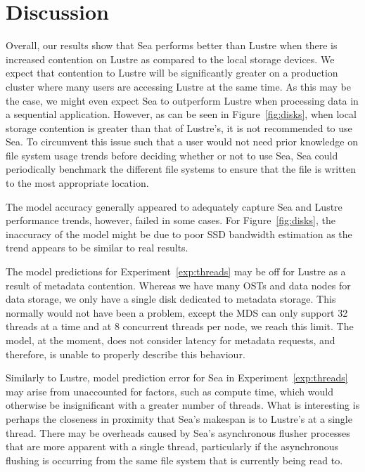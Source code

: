 \documentclass{report}
\begin{document}
    \section{Discussion}\label{discussion}

    Overall, our results show that Sea performs better than Lustre when there is
    increased contention on Lustre as compared to the local storage devices. We
    expect that contention to Lustre will be significantly greater on a 
    production cluster where many users are accessing Lustre at the same time.
    As this may be the case, we might even expect Sea to outperform Lustre when
    processing data in a sequential application. However, as can be seen in
    Figure~\ref{fig:disks}, when local storage contention is greater than that
    of Lustre's, it is not recommended to use Sea. To circumvent this issue
    such that a user would not need prior knowledge on file system usage trends
    before deciding whether or not to use Sea, Sea could periodically benchmark
    the different file systems to ensure that the file is written to the most
    appropriate location.

    The model accuracy generally appeared to adequately capture Sea and Lustre
    performance trends, however, failed in some cases.
    For Figure~\ref{fig:disks}, the inaccuracy of the model might be due to poor
    SSD bandwidth estimation as the trend appears to be similar to real results.
    
    The model predictions for Experiment~\ref{exp:threads} may be off for Lustre as a result
    of metadata contention. Whereas we have many OSTs and data nodes for
    data storage, we only have a single disk dedicated to metadata storage.
    This normally would not have been a problem, except the MDS can only support
    32 threads at a time and at 8 concurrent threads per node, we reach this limit.
    The model, at the moment, does not consider latency for metadata requests, and 
    therefore, is unable to properly describe this behaviour.

    Similarly to Lustre, model prediction error for Sea in Experiment~\ref{exp:threads}
    may arise from unaccounted for factors, such as compute time, which would otherwise
    be insignificant with a greater number of threads. What is interesting is perhaps
    the closeness in proximity that Sea's makespan is to Lustre's at a single thread.
    There may be overheads caused by Sea's asynchronous flusher processes that are more
    apparent with a single thread, particularly if the asynchronous flushing is occurring
    from the same file system that is currently being read to. 
\end{document}
